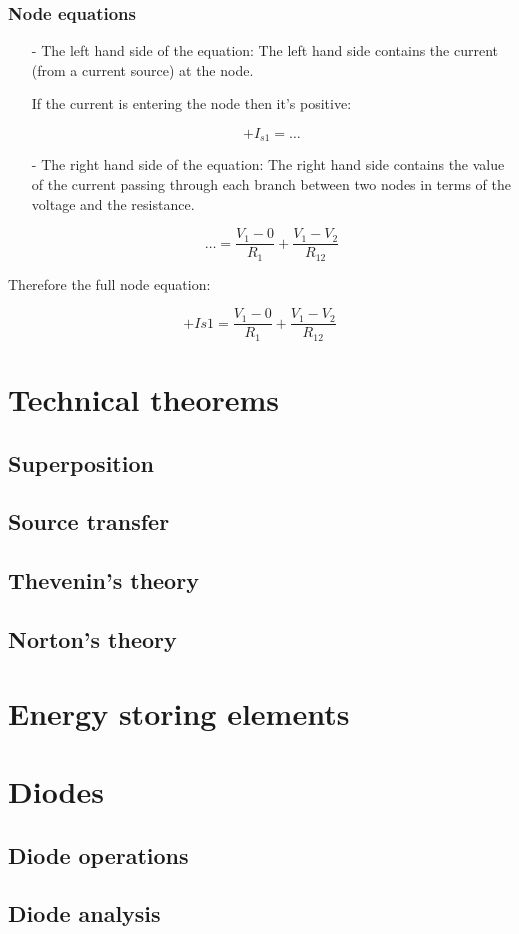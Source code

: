 \documentclass[a4paper]{book}
\begin{document}
\subsubsection{Node equations}

\begin{itemize}

  \item[-] The left hand side of the equation:
    The left hand side contains the current (from a current source) at the node.

    If the current is entering the node then it's positive:

    \[+I_{s1} = \ldots\]

  \item[-] The right hand side of the equation:
    The right hand side contains the value of the current passing
    through each branch between two nodes in terms of the voltage and the resistance.

    \[\ldots = \frac{V_1 - 0}{R_1} + \frac{V_1 - V_2}{R_{12}}\]

\end{itemize}

Therefore the full node equation:

\[+I{s1} = \frac{V_1 - 0}{R_1} + \frac{V_1 - V_2}{R_{12}}\]

\section{Technical theorems}
  \subsection{Superposition}
  \subsection{Source transfer}
  \subsection{Thevenin's theory}
  \subsection{Norton's theory}
\section{Energy storing elements}
\section{Diodes}
  \subsection{Diode operations}
  \subsection{Diode analysis}
\end{document}

